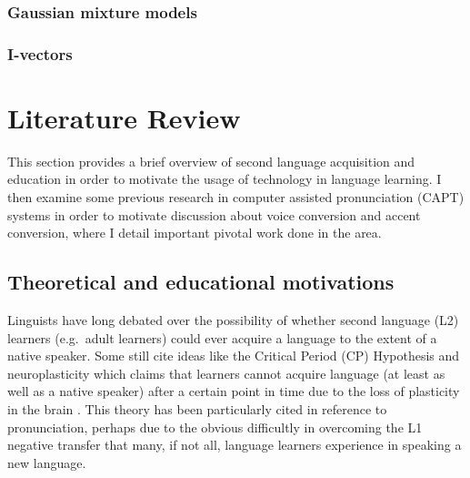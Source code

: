\documentclass
[
    a4paper,
    twoside,
    12pt
]
{report}
\begin{document}
\subsection{Gaussian mixture models}

\subsection{I-vectors}
\chapter{Literature Review}

This section provides a brief overview of second language acquisition
and education in order to motivate the usage of technology in language
learning. I then examine some previous research in computer assisted
pronunciation (CAPT) systems in order to motivate discussion about voice
conversion and accent conversion, where I detail important pivotal work
done in the area.

\hypertarget{theoretical-and-educational-motivations}{%
\section{Theoretical and educational
motivations}\label{theoretical-and-educational-motivations}}

\label{sec:theo-edu} Linguists have long debated over the possibility of
whether second language (L2) learners (e.g.~adult learners) could ever
acquire a language to the extent of a native speaker. Some still cite
ideas like the Critical Period (CP) Hypothesis and neuroplasticity which
claims that learners cannot acquire language (at least as well as a
native speaker) after a certain point in time due to the loss of
plasticity in the brain \parencite{lenneberg1967,scovel1988}. This
theory has been particularly cited in reference to pronunciation,
perhaps due to the obvious difficultly in overcoming the L1 negative
transfer that many, if not all, language learners experience in speaking
a new language.
\end{document}
